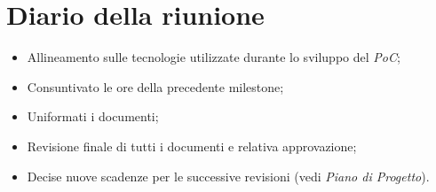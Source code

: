 \section{Diario della riunione}
\begin{itemize}
  \item Allineamento sulle tecnologie utilizzate durante lo sviluppo del \textit{PoC};
  \item Consuntivato le ore della precedente milestone;
  \item Uniformati i documenti;
  \item Revisione finale di tutti i documenti e relativa approvazione;
  \item Decise nuove scadenze per le successive revisioni (vedi \textit{Piano di Progetto}).
\end{itemize}
